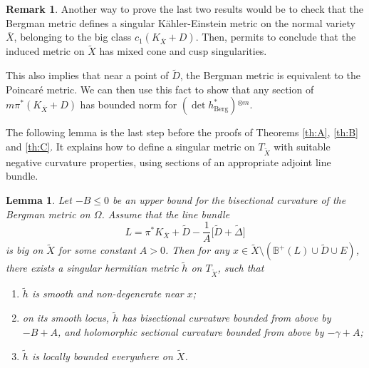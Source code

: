 \documentclass[10pt]{amsart}
\theoremstyle{plain}
\newtheorem{lemma}[theorem]{Lemma}
\theoremstyle{definition}
\newtheorem{remark}[theorem]{Remark}
\numberwithin{equation}{theorem}
\newenvironment{enumerateth}
{\bgroup\def\theenumi{\thetheorem.\arabic{enumi}}
\begin{enumerate}
\setcounter{enumi}{\value{equation}}}
{\setcounter{equation}{\value{enumi}}
\end{enumerate}
\egroup}
\begin{document}
\begin{remark}
Another way to prove the last two results would be to check that the Bergman metric defines a singular Kähler-Einstein metric on the normal variety~$\overline{X}$, belonging to the big class $c_1(K_{\overline{X}} + D)$. Then, \cite[Prop.\,2, Th.\,3]{GP16} permits to conclude that the induced metric on $\widetilde{X}$ has mixed cone and cusp singularities.

This also implies that near a point of $\widetilde{D}$, the Bergman metric is equivalent to the Poincaré metric. We can then use this fact to show that any section of $m \pi^\ast (K_{\overline{X}} + D)$ has bounded norm for $(\det h_{\mathrm{Berg}}^\ast ){}^{\otimes m}$.
\end{remark}

The following lemma is the last step before the proofs of Theorems \ref{th:A}, \ref{th:B} and \ref{th:C}. It explains how to define a singular metric on $T_{\widetilde{X}}$ with suitable negative curvature properties, using sections of an appropriate adjoint line bundle.

\begin{lemma} \label{lemcritere} Let $- B \leq 0$ be an upper bound for the bisectional curvature of the Bergman metric on $\Omega$. Assume that the line bundle
$$
L = \pi^\ast K_{\overline{X}} + \widetilde{D} - \frac{1}{A} \bigl[ \widetilde{D} + \widetilde{\Delta} \bigr]
$$
is big on $\widetilde{X}$ for some constant $A > 0$. Then for any $x \in \widetilde{X} \setminus( \mathbb B^+(L) \cup \widetilde{D} \cup E)$, there exists a singular hermitian metric $\widetilde{h}$ on $T_{\widetilde{X}}$, such that
\begin{enumerateth}
\item $\widetilde{h}$ is smooth and non-degenerate near $x$;
\item on its smooth locus, $\widetilde{h}$ has bisectional curvature bounded from above by $- B + A$, and holomorphic sectional curvature bounded from above by $- \gamma + A$;
\item $\widetilde{h}$ is locally bounded everywhere on $\widetilde{X}$.
\end{enumerateth}
\end{lemma}
\end{document}

